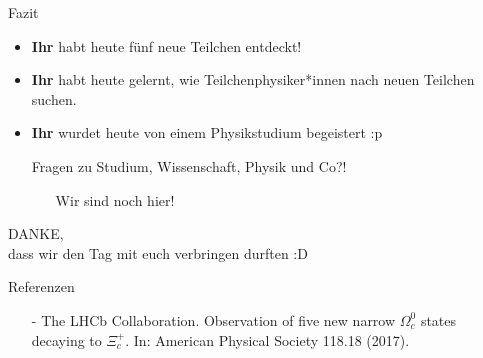 
\begin{frame}{Fazit}
    \begin{itemize}
        \item \textbf{Ihr} habt heute fünf neue Teilchen entdeckt!
        \item \textbf{Ihr} habt heute gelernt, wie Teilchenphysiker*innen nach neuen Teilchen suchen.
        \item \textbf{Ihr} wurdet heute von einem Physikstudium begeistert :p
        \vspace{0.5cm}
        \item[] Fragen zu Studium, Wissenschaft, Physik und Co?! 
        \begin{itemize}
            \item[\ding{43}] Wir sind noch hier!
        \end{itemize}
    \end{itemize}
\end{frame}
\begin{frame}
\begin{center}
\Huge{DANKE}\normalsize, \\
 dass wir den Tag mit euch verbringen durften :D
\end{center}
\end{frame}
\begin{frame}{Referenzen}
    \begin{itemize}\footnotesize
        \item [-] The LHCb Collaboration. Observation of five new narrow $\Omega_c^0$ states decaying to $\Xi_c^+$. In: American Physical Society 118.18 (2017).
    \end{itemize}
\end{frame}
